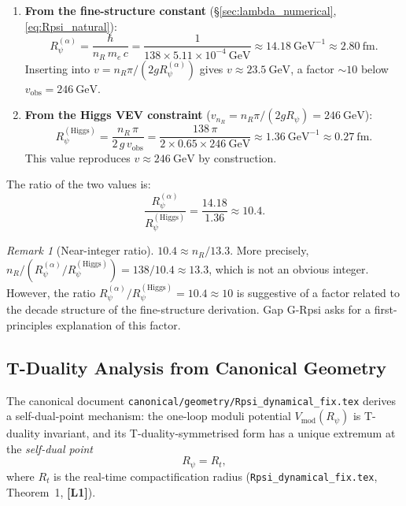\documentclass[12pt]{article}
\theoremstyle{definition}
\theoremstyle{remark}
\newtheorem{remark}[theorem]{Remark}
\newcommand{\Lone}{\textbf{[L1]}}
\begin{document}
\begin{enumerate}
  \item \textbf{From the fine-structure constant} (§\ref{sec:lambda_numerical},
        \eqref{eq:Rpsi_natural}):
        \begin{equation}
          R_\psi^{(\alpha)} = \frac{\hbar}{n_R\,m_e\,c}
          = \frac{1}{138 \times 5.11\times10^{-4}~\text{GeV}}
          \approx 14.18~\text{GeV}^{-1} \approx 2.80~\text{fm}.
          \label{eq:Rpsi_alpha}
        \end{equation}
        Inserting into $v = n_R\pi/(2g R_\psi^{(\alpha)})$ gives
        $v \approx 23.5~\text{GeV}$, a factor $\sim 10$ below
        $v_{\text{obs}} = 246~\text{GeV}$.

  \item \textbf{From the Higgs VEV constraint}
        ($v_{n_R} = n_R\pi/(2g R_\psi) = 246~\text{GeV}$):
        \begin{equation}
          R_\psi^{(\text{Higgs})}
          = \frac{n_R\,\pi}{2\,g\,v_{\text{obs}}}
          = \frac{138\,\pi}{2 \times 0.65 \times 246~\text{GeV}}
          \approx 1.36~\text{GeV}^{-1} \approx 0.27~\text{fm}.
          \label{eq:Rpsi_Higgs}
        \end{equation}
        This value reproduces $v \approx 246~\text{GeV}$ by construction.
\end{enumerate}

\noindent The ratio of the two values is:
\begin{equation}
  \frac{R_\psi^{(\alpha)}}{R_\psi^{(\text{Higgs})}}
  = \frac{14.18}{1.36} \approx 10.4.
  \label{eq:Rpsi_ratio}
\end{equation}

\begin{remark}[Near-integer ratio]
$10.4 \approx n_R/13.3$.  More precisely,
$n_R / (R_\psi^{(\alpha)}/R_\psi^{(\text{Higgs})}) = 138/10.4 \approx 13.3$,
which is not an obvious integer.  However, the ratio
$R_\psi^{(\alpha)}/R_\psi^{(\text{Higgs})} = 10.4 \approx 10$
is suggestive of a factor related to the decade structure of the
fine-structure derivation.  Gap G-Rpsi asks for a first-principles
explanation of this factor.
\end{remark}

\subsection{T-Duality Analysis from Canonical Geometry}

The canonical document
\texttt{canonical/geometry/Rpsi\_dynamical\_fix.tex} derives a
self-dual-point mechanism: the one-loop moduli potential
$V_{\mathrm{mod}}(R_\psi)$ is T-duality invariant, and its
T-duality-symmetrised form has a unique extremum at the \emph{self-dual
point}
\begin{equation}
  R_\psi = R_t,
  \label{eq:self_dual}
\end{equation}
where $R_t$ is the real-time compactification radius
(\texttt{Rpsi\_dynamical\_fix.tex}, Theorem~1, \Lone).
\end{document}
